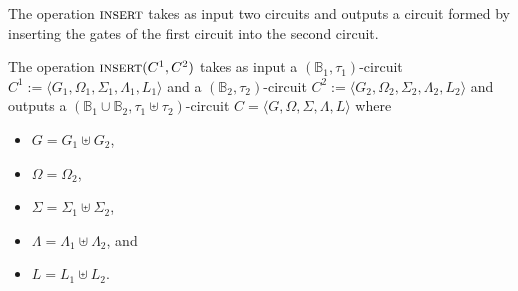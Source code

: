 \documentclass[../paper.tex]{subfiles}
\begin{document}


The operation ${\normalfont\textsc{insert}}$ takes as input two circuits and outputs a circuit
formed by inserting the gates of the first circuit into the second circuit.

\begin{definition}
  The operation ${\normalfont\textsc{insert}}(C^1, C^2)$ takes as input a $(\mathbb{B}_1,
  \tau_1)$-circuit $C^1 := \langle G_1, \Omega_1, \Sigma_1 , \Lambda_1, L_1
  \rangle$ and a $(\mathbb{B}_2, \tau_2)$-circuit $C^2 := \langle G_2, \Omega_2,
  \Sigma_2 , \Lambda_2, L_2 \rangle$ and outputs a $(\mathbb{B}_1 \cup
  \mathbb{B}_2, \tau_1 \uplus \tau_2)$-circuit $C = \langle G, \Omega, \Sigma ,
  \Lambda, L \rangle$ where
  \begin{itemize}
    \setlength\itemsep{0mm}
  \item $G = G_1 \uplus G_2$,
  \item $\Omega = \Omega_2$,
  \item $\Sigma = \Sigma_1 \uplus \Sigma_2$,
  \item $\Lambda = \Lambda_1 \uplus \Lambda_2$, and
  \item $L = L_1 \uplus L_2$.
  \end{itemize}
\end{definition}
\end{document}
